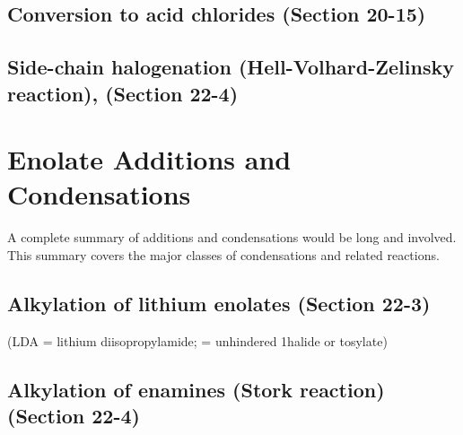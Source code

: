 \subsection{Conversion to acid chlorides \normalfont(Section 20-15)}



\subsection{Side-chain halogenation (Hell-Volhard-Zelinsky reaction), \normalfont(Section 22-4)}




\section{Enolate Additions and Condensations}

A complete summary of additions and condensations would be long and involved. This summary covers the major classes of condensations and related reactions.

\subsection{Alkylation of lithium enolates \normalfont(Section 22-3)}

(LDA = lithium diisopropylamide;  = unhindered 1\degree halide or tosylate)


\subsection{Alkylation of enamines (Stork reaction) \normalfont(Section 22-4)}

